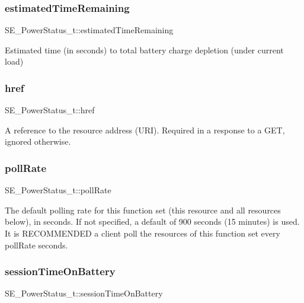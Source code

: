 \subsubsection{\texorpdfstring{estimated\+Time\+Remaining}{estimatedTimeRemaining}}
{\footnotesize\ttfamily S\+E\+\_\+\+Power\+Status\+\_\+t\+::estimated\+Time\+Remaining}

Estimated time (in seconds) to total battery charge depletion (under current load) \mbox{\label{group__PowerStatus_gab2376abd124d3ae0ee8713cc53492976}} 
\subsubsection{\texorpdfstring{href}{href}}
{\footnotesize\ttfamily S\+E\+\_\+\+Power\+Status\+\_\+t\+::href}

A reference to the resource address (U\+RI). Required in a response to a G\+ET, ignored otherwise. \mbox{\label{group__PowerStatus_gaaf69ae89597ebb0d2ea0a5c7d47b404c}} 
\subsubsection{\texorpdfstring{poll\+Rate}{pollRate}}
{\footnotesize\ttfamily S\+E\+\_\+\+Power\+Status\+\_\+t\+::poll\+Rate}

The default polling rate for this function set (this resource and all resources below), in seconds. If not specified, a default of 900 seconds (15 minutes) is used. It is R\+E\+C\+O\+M\+M\+E\+N\+D\+ED a client poll the resources of this function set every poll\+Rate seconds. \mbox{\label{group__PowerStatus_gac193c010e747194a855b7e0b266c3710}} 
\subsubsection{\texorpdfstring{session\+Time\+On\+Battery}{sessionTimeOnBattery}}
{\footnotesize\ttfamily S\+E\+\_\+\+Power\+Status\+\_\+t\+::session\+Time\+On\+Battery}

